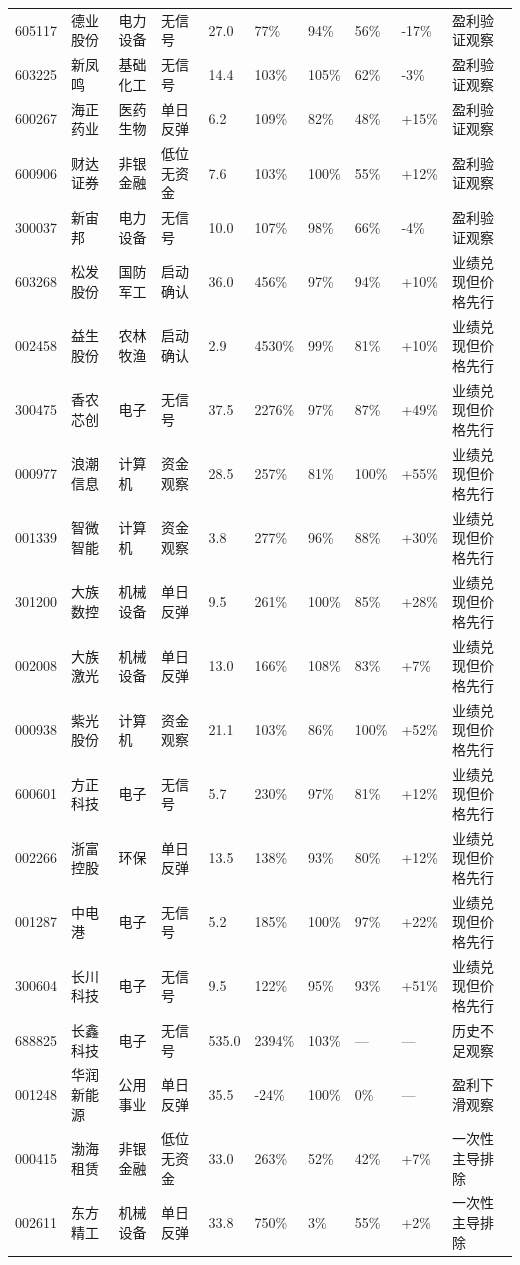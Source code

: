 \begin{longtable}{L{1.05cm}L{1.55cm}L{1.45cm}L{1.25cm}R{0.90cm}R{0.90cm}R{0.90cm}R{0.95cm}R{0.95cm}L{2.05cm}}
605117 & 德业股份 & 电力设备 & 无信号 & 27.0 & 77\% & 94\% & 56\% & -17\% & 盈利验证观察 \\
603225 & 新凤鸣 & 基础化工 & 无信号 & 14.4 & 103\% & 105\% & 62\% & -3\% & 盈利验证观察 \\
600267 & 海正药业 & 医药生物 & 单日反弹 & 6.2 & 109\% & 82\% & 48\% & +15\% & 盈利验证观察 \\
600906 & 财达证券 & 非银金融 & 低位无资金 & 7.6 & 103\% & 100\% & 55\% & +12\% & 盈利验证观察 \\
300037 & 新宙邦 & 电力设备 & 无信号 & 10.0 & 107\% & 98\% & 66\% & -4\% & 盈利验证观察 \\
603268 & 松发股份 & 国防军工 & 启动确认 & 36.0 & 456\% & 97\% & 94\% & +10\% & 业绩兑现但价格先行 \\
002458 & 益生股份 & 农林牧渔 & 启动确认 & 2.9 & 4530\% & 99\% & 81\% & +10\% & 业绩兑现但价格先行 \\
300475 & 香农芯创 & 电子 & 无信号 & 37.5 & 2276\% & 97\% & 87\% & +49\% & 业绩兑现但价格先行 \\
000977 & 浪潮信息 & 计算机 & 资金观察 & 28.5 & 257\% & 81\% & 100\% & +55\% & 业绩兑现但价格先行 \\
001339 & 智微智能 & 计算机 & 资金观察 & 3.8 & 277\% & 96\% & 88\% & +30\% & 业绩兑现但价格先行 \\
301200 & 大族数控 & 机械设备 & 单日反弹 & 9.5 & 261\% & 100\% & 85\% & +28\% & 业绩兑现但价格先行 \\
002008 & 大族激光 & 机械设备 & 单日反弹 & 13.0 & 166\% & 108\% & 83\% & +7\% & 业绩兑现但价格先行 \\
000938 & 紫光股份 & 计算机 & 资金观察 & 21.1 & 103\% & 86\% & 100\% & +52\% & 业绩兑现但价格先行 \\
600601 & 方正科技 & 电子 & 无信号 & 5.7 & 230\% & 97\% & 81\% & +12\% & 业绩兑现但价格先行 \\
002266 & 浙富控股 & 环保 & 单日反弹 & 13.5 & 138\% & 93\% & 80\% & +12\% & 业绩兑现但价格先行 \\
001287 & 中电港 & 电子 & 无信号 & 5.2 & 185\% & 100\% & 97\% & +22\% & 业绩兑现但价格先行 \\
300604 & 长川科技 & 电子 & 无信号 & 9.5 & 122\% & 95\% & 93\% & +51\% & 业绩兑现但价格先行 \\
688825 & 长鑫科技 & 电子 & 无信号 & 535.0 & 2394\% & 103\% & --- & --- & 历史不足观察 \\
001248 & 华润新能源 & 公用事业 & 单日反弹 & 35.5 & -24\% & 100\% & 0\% & --- & 盈利下滑观察 \\
000415 & 渤海租赁 & 非银金融 & 低位无资金 & 33.0 & 263\% & 52\% & 42\% & +7\% & 一次性主导排除 \\
002611 & 东方精工 & 机械设备 & 单日反弹 & 33.8 & 750\% & 3\% & 55\% & +2\% & 一次性主导排除 \\
\bottomrule
\end{longtable}
\normalsize
{}

